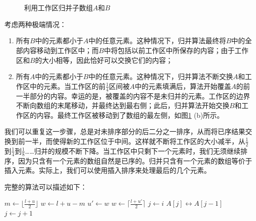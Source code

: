 \documentclass[b5paper]{ctexart}
\begin{document}
\begin{figure}[htbp]
 \centering
  \\
  \\
 \caption{利用工作区归并子数组$A$和$B$}
 \label{fig:merge-in-place-setup}
\end{figure}

考虑两种极端情况：

\begin{enumerate}
\item 所有$B$中的元素都小于$A$中的任意元素。这种情况下，归并算法最终将$B$中的全部内容移动到工作区中；而$B$中将包括以前工作区中所保存的内容；由于工作区和$B$的大小相等，因此恰好可以交换它们的内容；
\item 所有$A$中的元素都小于$B$中的任意元素。这种情况下，归并算法不断交换$A$和工作区中的元素。当工作区的前$\frac{1}{4}$区间被$A$中的元素填满后，算法开始覆盖$A$的前一半部分的内容。幸运的是，被覆盖的内容不是未归并的元素。工作区的边界不断向数组的末尾移动，并最终达到最右侧；此后，归并算法开始交换$B$和工作区的内容。最终工作区被移动到了数组的最左侧，如图\ref{fig:merge-in-place-setup} (b)所示。
\end{enumerate}

我们可以重复这一步骤，总是对未排序部分的后二分之一排序，从而将已序结果交换到前一半，而使得新的工作区位于中间。这样就不断将工作区的大小减半，从$\frac{1}{2}$到$\frac{1}{4}$到$\frac{1}{8}$……归并的规模不断下降。当工作区中只剩下一个元素时，我们无须继续排序，因为只含有一个元素的数组自然是已序的。归并只含有一个元素的数组等价于插入元素。实际上，我们可以使用插入排序来处理最后的几个元素。

完整的算法可以描述如下：

\begin{algorithmic}[1]
    \State $m \gets \lfloor \frac{l + u}{2} \rfloor$
    \State $w \gets l + u - m$
    \State {} 
      \State $u' \gets w$
      \State $w \gets \lceil \frac{l + u'}{2} \rceil$ 
      \State {} 
      \State {}
    \EndWhile
     
      \State $j \gets i$
        \State {} $A[j] \leftrightarrow A[j-1]$
        \State $j \gets j + 1$
      \EndWhile
    \EndFor
  \EndIf
\EndProcedure
\end{algorithmic}
\end{document}
